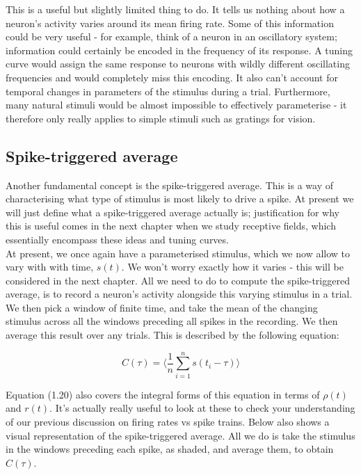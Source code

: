 \documentclass{article}
\begin{document}
This is a useful but slightly limited thing to do. It tells us nothing about how a neuron's activity varies around its mean firing rate. Some of this information could be very useful - for example, think of a neuron in an oscillatory system; information could certainly be encoded in the frequency of its response. A tuning curve would assign the same response to neurons with wildly different oscillating frequencies and would completely miss this encoding. It also can't account for temporal changes in parameters of the stimulus during a trial. Furthermore, many natural stimuli would be almost impossible to effectively parameterise - it therefore only really applies to simple stimuli such as gratings for vision.

\subsection{Spike-triggered average}

Another fundamental concept is the spike-triggered average. This is a way of characterising what type of stimulus is most likely to drive a spike. At present we will just define what a spike-triggered average actually is; justification for why this is useful comes in the next chapter when we study receptive fields, which essentially encompass these ideas and tuning curves.\\

At present, we once again have a parameterised stimulus, which we now allow to vary with with time, $s(t)$. We won't worry exactly how it varies - this will be considered in the next chapter. All we need to do to compute the spike-triggered average, is to record a neuron's activity alongside this varying stimulus in a trial. We then pick a window of finite time, and take the mean of the changing stimulus across all the windows preceding all spikes in the recording. We then average this result over any trials. This is described by the following equation:

\begin{equation*}
	C(\tau) = \langle\frac{1}{n}\sum_{i=1}^n s(t_i-\tau)\rangle
\end{equation*}

Equation (1.20) also covers the integral forms of this equation in terms of $\rho(t)$ and $r(t)$. It's actually really useful to look at these to check your understanding of our previous discussion on firing rates vs spike trains. Below also shows a visual representation of the spike-triggered average. All we do is take the stimulus in the windows preceding each spike, as shaded, and average them, to obtain $C(\tau)$.\\
\end{document}
